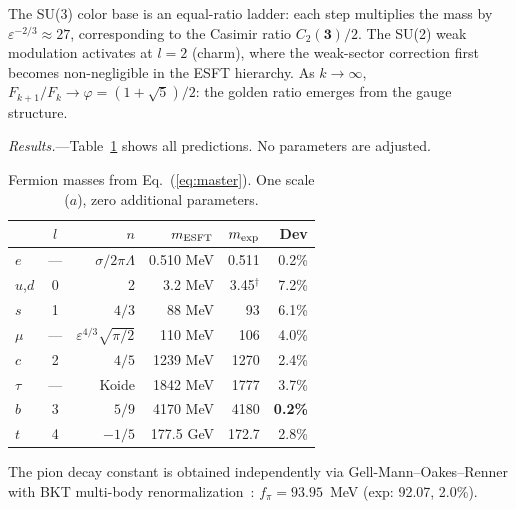 ﻿\documentclass[twocolumn,showpacs,preprintnumbers,amsmath,amssymb,prl]{revtex4-2}
\begin{document}
The SU(3) color base is an equal-ratio ladder: each step multiplies the mass by $\varepsilon^{-2/3} \approx 27$, corresponding to the Casimir ratio $C_2(\mathbf{3})/2$. The SU(2) weak modulation activates at $l=2$ (charm), where the weak-sector correction first becomes non-negligible in the ESFT hierarchy. As $k\to\infty$, $F_{k+1}/F_k \to \varphi = (1+\sqrt{5})/2$: the golden ratio emerges from the gauge structure.

\emph{Results.}---Table~\ref{tab:all} shows all predictions. No parameters are adjusted.

\begin{table}[h]
\caption{Fermion masses from Eq.~(\ref{eq:master}). One scale ($a$), zero additional parameters.}
\label{tab:all}
\begin{ruledtabular}
\begin{tabular}{lcrrrr}
& $l$ & $n$ & $m_{\rm ESFT}$ & $m_{\rm exp}$ & Dev \\
\hline
$e$ & --- & $\sigma/2\pi\Lambda$ & 0.510 MeV & 0.511 & 0.2\% \\
$u$,$d$ & 0 & 2 & 3.2 MeV & 3.45$^\dagger$ & 7.2\% \\
$s$ & 1 & $4/3$ & 88 MeV & 93 & 6.1\% \\
$\mu$ & --- & $\varepsilon^{4/3}\sqrt{\pi/2}$ & 110 MeV & 106 & 4.0\% \\
$c$ & 2 & $4/5$ & 1239 MeV & 1270 & 2.4\% \\
$\tau$ & --- & Koide & 1842 MeV & 1777 & 3.7\% \\
$b$ & 3 & $5/9$ & 4170 MeV & 4180 & \textbf{0.2\%} \\
$t$ & 4 & $-1/5$ & 177.5 GeV & 172.7 & 2.8\% \\
\end{tabular}
\end{ruledtabular}
\end{table}

The pion decay constant is obtained independently via Gell-Mann--Oakes--Renner with BKT multi-body renormalization~\cite{Paper4}: $f_\pi = 93.95$~MeV (exp: 92.07, 2.0\%).
\end{document}

